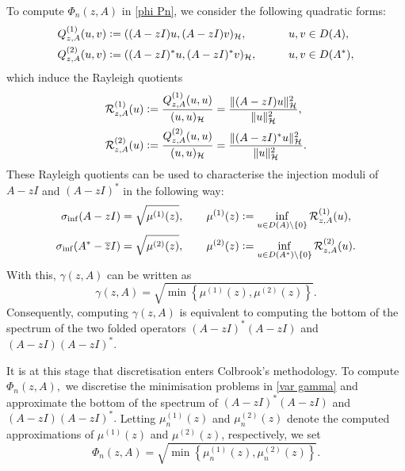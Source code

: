 To compute $\Phi_n(z, A)$ in \eqref{phi Pn}, we consider the following quadratic forms:
\begin{align}
    Q_{z, A}^{(1)}(u, v)&\vcentcolon= ((A-zI)u, (A-zI)v)_{\mathcal{H}}, &\quad u, v &\in D(A),\label{Q1}\\
    Q_{z, A}^{(2)}(u, v) &\vcentcolon= ((A-zI)^*u, (A-zI)^*v)_{\mathcal{H}}, &\qquad u, v &\in D(A^*),\label{Q2}
\end{align}
which induce the Rayleigh quotients
\begin{align}
\mathcal{R}_{z, A}^{(1)}(u) &\vcentcolon= \frac{Q_{z, A}^{(1)}(u, u)}{(u, u)_{\mathcal{H}}} = \frac{\|(A-zI)u\|_{\mathcal{H}}^2}{\|u\|_{\mathcal{H}}^2}, \label{R1}\\
\mathcal{R}_{z, A}^{(2)}(u) &\vcentcolon= \frac{Q_{z, A}^{(2)}(u, u)}{(u, u)_{\mathcal{H}}} = \frac{\|(A-zI)^*u\|_{\mathcal{H}}^2}{\|u\|_{\mathcal{H}}^2}.\label{R2}
\end{align}
These Rayleigh quotients can be used to characterise the injection moduli of $A-zI$ and $(A - zI)^*$ in the following way:
\begin{align}
\sigma_{\inf}(A-zI) &= \sqrt{ \mu^{(1)}(z) }, \qquad \mu^{(1)}(z) \vcentcolon= \inf_{u \in D(A)\setminus\{0\}} \mathcal{R}_{z, A}^{(1)}(u),\\
\sigma_{\inf}(A^*-\overline{z}I) &= \sqrt{ \mu^{(2)}(z) }, \qquad \mu^{(2)}(z) \vcentcolon= \inf_{u \in D(A^*)\setminus\{0\}} \mathcal{R}_{z, A}^{(2)}(u).
\end{align}
With this, $\gamma(z, A)$ can be written as 
\begin{equation} \label{var gamma}
    \gamma(z, A) = \sqrt{ \min \left\{\mu^{(1)}(z), \mu^{(2)}(z)  \right\}  }.
\end{equation}
Consequently, computing $\gamma(z, A)$ is equivalent to computing the bottom of the spectrum of the two folded operators $(A-zI)^*(A-zI)$ and $(A-zI)(A-zI)^*.$ 


It is at this stage that discretisation enters Colbrook's methodology. To compute $\Phi_n(z,A),$ we discretise the minimisation problems in \eqref{var gamma} and approximate the bottom of the spectrum of $(A-zI)^*(A-zI)$ and $(A-zI)(A-zI)^*.$ Letting $\mu_n^{(1)}(z)$ and $\mu_n^{(2)}(z)$ denote the computed approximations of $\mu^{(1)}(z)$ and $\mu^{(2)}(z)$, respectively, we set
\begin{equation} \label{old approx phi}
    \Phi_n(z, A) = \sqrt{ \min \left\{ \mu_n^{(1)}(z), \mu_n^{(2)}(z) \right\} }.
\end{equation}

